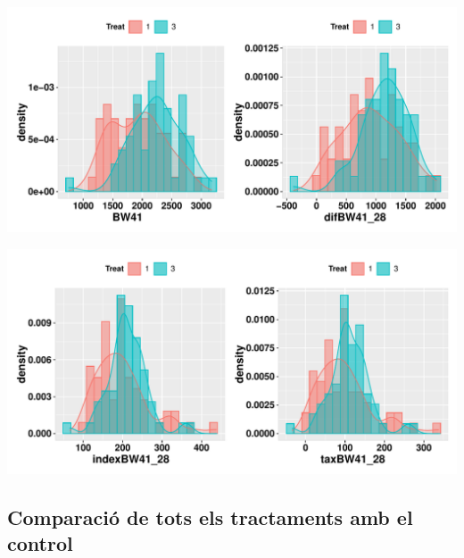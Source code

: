 \documentclass[11pt,a4paper]{article}\usepackage[]{graphicx}\usepackage[]{color}
\makeatletter
\def\maxwidth{ %
  \ifdim\Gin@nat@width>\linewidth
    \linewidth
  \else
    \Gin@nat@width
  \fi
}
\newenvironment{knitrout}{}{} %
\makeatother
\begin{document}
\begin{knitrout}
\color{fgcolor}
\includegraphics[width=\maxwidth]{figure/unnamed-chunk-8-1} 

\includegraphics[width=\maxwidth]{figure/unnamed-chunk-8-2} 

\end{knitrout}

\clearpage
\subsection{Comparació de tots els tractaments amb el control}
\end{document}
